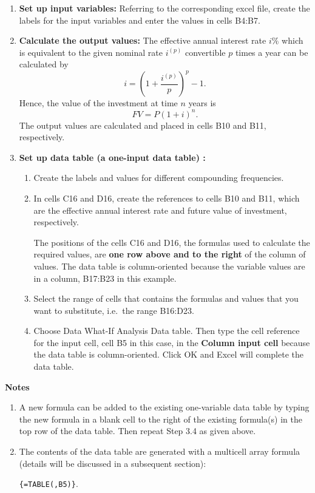 \documentclass[
]{article}
\theoremstyle{definition}
\theoremstyle{definition}
\theoremstyle{definition}
\theoremstyle{definition}
\theoremstyle{remark}
\begin{document}
\begin{enumerate}
\def\labelenumi{\arabic{enumi}.}
\item
  \textbf{Set up input variables:} Referring to the corresponding excel
  file, create the labels for the input variables and enter the values
  in cells B4:B7.
\item
  \textbf{Calculate the output values:} The effective annual interest rate
  \(i\%\) which is equivalent to the given nominal rate \(i^{(p)}\)
  convertible \(p\) times a year can be calculated by
  \[i = \left(1 + \frac{i^{(p)}}{p} \right)^p - 1.\] Hence, the value
  of the investment at time \(n\) years is \[FV = P (1 + i)^n.\] The
  output values are calculated and placed in cells B10 and B11,
  respectively.
\item
  \textbf{Set up data table (a one-input data table) :}

  \begin{enumerate}
  \def\labelenumii{\arabic{enumii}.}
  \item
    Create the labels and values for different compounding
    frequencies.
  \item
    In cells C16 and D16, create the references to cells B10 and
    B11, which are the effective annual interest rate and future
    value of investment, respectively.

    The positions of the cells C16 and D16, the formulas used to
    calculate the required values, are \textbf{one row above and to the
    right} of the column of values. The data table is
    column-oriented because the variable values are in a column,
    B17:B23 in this example.
  \item
    Select the range of cells that contains the formulas and values
    that you want to substitute, i.e.~the range B16:D23.
  \item
    Choose Data
    What-If Analysis Data table. Then type the cell reference for
    the input cell, cell B5 in this case, in the \textbf{Column input
    cell} because the data table is column-oriented. Click OK and
    Excel will complete the data table.
  \end{enumerate}
\end{enumerate}

\textbf{Notes}

\begin{enumerate}
\def\labelenumi{\arabic{enumi}.}
\item
  A new formula can be added to the existing one-variable data table
  by typing the new formula in a blank cell to the right of the
  existing formula(s) in the top row of the data table. Then repeat
  Step 3.4 as given above.
\item
  The contents of the data table are generated with a multicell array
  formula (details will be discussed in a subsequent section):

  \texttt{\{=TABLE(,B5)\}}.
\end{enumerate}
\end{document}
